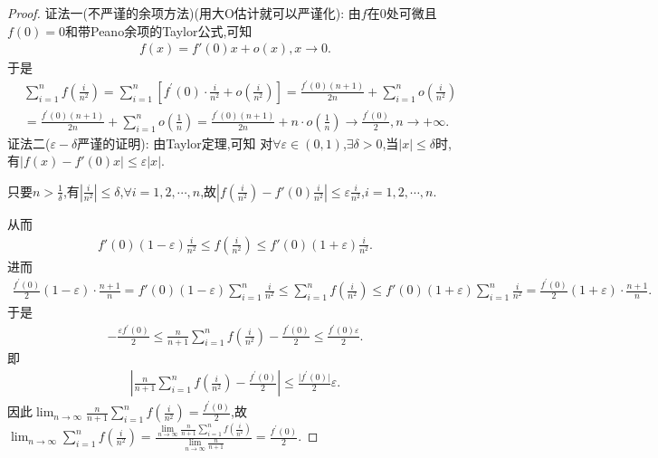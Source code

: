 \documentclass[../../main.tex]{subfiles}%
\begin{document}
\begin{proof}

{\color{blue}证法一(不严谨的余项方法)(用大O估计就可以严谨化):}
由\(f\)在\(0\)处可微且$f(0)=0$和带Peano余项的Taylor公式,可知
\begin{align*}
f(x)=f'(0)x+o(x),x\to0.
\end{align*}
于是
\begin{align*}
&\sum\limits_{i = 1}^{n} f\left(\frac{i}{n^2}\right) = \sum\limits_{i = 1}^{n} \left[f^{\prime}(0) \cdot \frac{i}{n^2} + o\left(\frac{i}{n^2}\right)\right]
= \frac{f^{\prime}(0)(n + 1)}{2n} + \sum\limits_{i = 1}^{n} o\left(\frac{i}{n^2}\right)\\
&= \frac{f^{\prime}(0)(n + 1)}{2n} + \sum\limits_{i = 1}^{n} o\left(\frac{1}{n}\right)
= \frac{f^{\prime}(0)(n + 1)}{2n} + n\cdot o\left(\frac{1}{n}\right) \to \frac{f^{\prime}(0)}{2},n\to+\infty.
\end{align*}
{\color{blue}证法二($\varepsilon-\delta$严谨的证明):}
由Taylor定理,可知
对\(\forall \varepsilon \in (0,1)\),\(\exists \delta > 0\),当\(\vert x \vert \leqslant  \delta\)时,有\(\vert f(x) - f'(0)x \vert \leqslant  \varepsilon \vert x \vert\).

只要\(n > \frac{1}{\delta}\),有\(\left\vert \frac{i}{n^2} \right\vert \leqslant  \delta\),\(\forall i = 1,2,\cdots,n\),故\(\left\vert f\left(\frac{i}{n^2}\right) - f'(0)\frac{i}{n^2} \right\vert \leqslant  \varepsilon \frac{i}{n^2}\),\(i = 1,2,\cdots,n\).

从而\begin{align*}
f'(0)(1 - \varepsilon) \frac{i}{n^2} \leqslant  f\left(\frac{i}{n^2}\right) \leqslant  f'(0)(1 + \varepsilon) \frac{i}{n^2}.
\end{align*}
进而
\begin{align*}
\frac{f^{\prime}(0)}{2} (1 - \varepsilon) \cdot \frac{n + 1}{n}=f'(0)(1 - \varepsilon) \sum\limits_{i = 1}^{n} \frac{i}{n^2} \leqslant  \sum\limits_{i = 1}^{n} f\left(\frac{i}{n^2}\right) \leqslant  f'(0)(1 + \varepsilon) \sum\limits_{i = 1}^{n} \frac{i}{n^2}=\frac{f^{\prime}(0)}{2} (1 + \varepsilon) \cdot \frac{n + 1}{n}.
\end{align*}
于是
\begin{align*}
-\frac{\varepsilon f^{\prime}(0)}{2} \leqslant  \frac{n}{n + 1} \sum\limits_{i = 1}^{n} f\left(\frac{i}{n^2}\right) - \frac{f^{\prime}(0)}{2} \leqslant  \frac{f^{\prime}(0)\varepsilon}{2} .
\end{align*}
即\begin{align*}
\left\vert \frac{n}{n + 1} \sum\limits_{i = 1}^{n} f\left(\frac{i}{n^2}\right) - \frac{f^{\prime}(0)}{2} \right\vert \leqslant  \frac{\vert f^{\prime}(0) \vert}{2} \varepsilon.
\end{align*}
因此$\lim_{n\rightarrow \infty} \frac{n}{n+1}\sum\limits_{i=1}^n{f\left( \frac{i}{n^2} \right)}=\frac{f^{\prime}(0)}{2}
$,故\(\lim_{n\rightarrow \infty} \sum\limits_{i=1}^n{f\left( \frac{i}{n^2} \right)}=\frac{\lim\limits_{n\rightarrow \infty} \frac{n}{n+1}\sum\limits_{i=1}^n{f\left( \frac{i}{n^2} \right)}}{\lim\limits_{n\rightarrow \infty} \frac{n}{n+1}}=\frac{f^{\prime}(0)}{2}\).
\end{proof}
\end{document}
